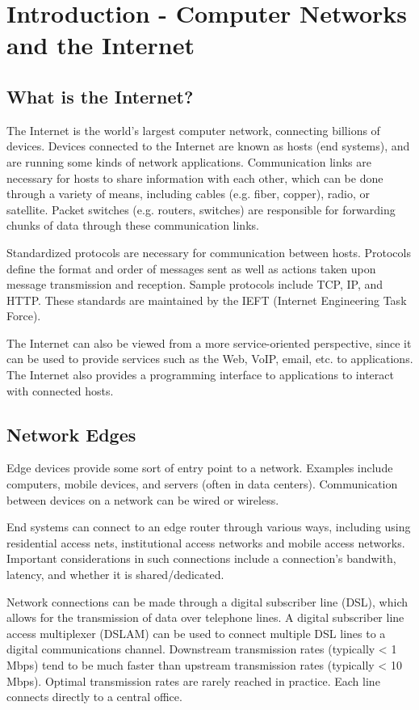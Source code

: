 \documentclass[12pt,titlepage]{article}
\begin{document}
  \section{Introduction - Computer Networks and the Internet}
    \subsection{What is the Internet?}
      The Internet is the world's largest computer network, connecting billions of devices. Devices
      connected to the Internet are known as hosts (end systems), and are running some kinds of network applications.
      Communication links are necessary for hosts to share information with each other, which can be done through
      a variety of means, including cables (e.g. fiber, copper), radio, or satellite. Packet switches (e.g. routers,
      switches) are responsible for forwarding chunks of data through these communication links.

      Standardized protocols are necessary for communication between hosts. Protocols define the format and order of
      messages sent as well as actions taken upon message transmission and reception. Sample protocols include TCP, IP, and HTTP.
      These standards are maintained by the IEFT (Internet Engineering Task Force).

      The Internet can also be viewed from a more service-oriented perspective, since it can be used to provide
      services such as the Web, VoIP, email, etc. to applications. The Internet also provides a programming interface
      to applications to interact with connected hosts.

    \subsection{Network Edges}
      Edge devices provide some sort of entry point to a network. Examples include computers, mobile devices, and servers
      (often in data centers). Communication between devices on a network can be wired or wireless.

      End systems can connect to an edge router through various ways, including using residential access nets, institutional
      access networks and mobile access networks. Important considerations in such connections include a connection's bandwith,
      latency, and whether it is shared/dedicated.

      Network connections can be made through a digital subscriber line (DSL), which allows for the transmission of data over
      telephone lines. A digital subscriber line access multiplexer (DSLAM) can be used to connect multiple DSL lines to a digital
      communications channel. Downstream transmission rates (typically < 1 Mbps) tend to be much faster than upstream transmission
      rates (typically < 10 Mbps). Optimal transmission rates are rarely reached in practice. Each line connects directly to a
      central office.
\end{document}
